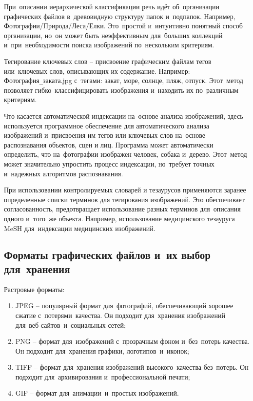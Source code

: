 \documentclass{ou}
\begin{document}
При~описании иерархической классификации речь идёт об~организации графических файлов в~древовидную структуру папок и~подпапок. Например, Фотографии/Природа/Леса/Елки. Это~простой и~интуитивно понятный способ организации, но~он может быть неэффективным для~больших коллекций и~при~необходимости поиска изображений по~нескольким критериям.

Тегирование ключевых слов -- присвоение графическим файлам тегов или~ключевых слов, описывающих их содержание. Например: Фотография\verb|_|заката.jpg с~тегами: закат, море, солнце, пляж, отпуск. Этот~метод позволяет гибко~классифицировать изображения и~находить их по~различным критериям.

Что касается автоматической индексации на~основе анализа изображений, здесь используется программное обеспечение для автоматического анализа изображений и~присвоения им тегов или ключевых слов на~основе распознавания объектов, сцен и лиц. Программа может автоматически определить, что на~фотографии изображен человек, собака и~дерево. Этот~метод может значительно упростить процесс индексации, но~требует точных и~надежных алгоритмов распознавания.

При использовании контролируемых словарей и тезаурусов применяются заранее определенные списки терминов для тегирования изображений. Это обеспечивает согласованность, предотвращает использование разных терминов для~описания одного и~того~же объекта. Например, использование медицинского тезауруса MeSH для~индексации медицинских изображений.
\subsection{Форматы графических файлов и~их выбор для~хранения}
Растровые форматы:
\begin{enumerate}[leftmargin=0em, itemindent=3.75em, nosep, label=\arabic*)]
\item JPEG -- популярный формат для~фотографий, обеспечивающий хорошее сжатие с~потерями~качества. Он подходит для~хранения изображений для~веб-сайтов~и~социальных сетей;
\item PNG -- формат для~изображений с~прозрачным фоном и~без~потерь качества. Он подходит для~хранения графики, логотипов~и~иконок;
\item TIFF -- формат для~хранения изображений высокого~качества без~потерь. Он подходит для~архивирования и~профессиональной печати;
\item GIF -- формат для~анимации~и~простых изображений.
\end{enumerate}
\end{document}
